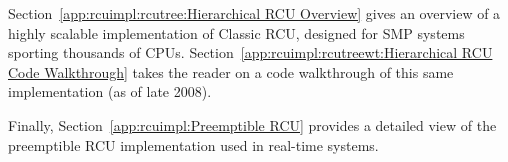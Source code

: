 Section~\ref{app:rcuimpl:rcutree:Hierarchical RCU Overview}
gives an overview of a highly scalable implementation of Classic
RCU, designed for SMP systems sporting thousands of CPUs.
Section~\ref{app:rcuimpl:rcutreewt:Hierarchical RCU Code Walkthrough}
takes the reader on a code walkthrough of this same implementation
(as of late 2008).

Finally,
Section~\ref{app:rcuimpl:Preemptible RCU}
provides a detailed view of the preemptible RCU implementation used
in real-time systems.
\fi






